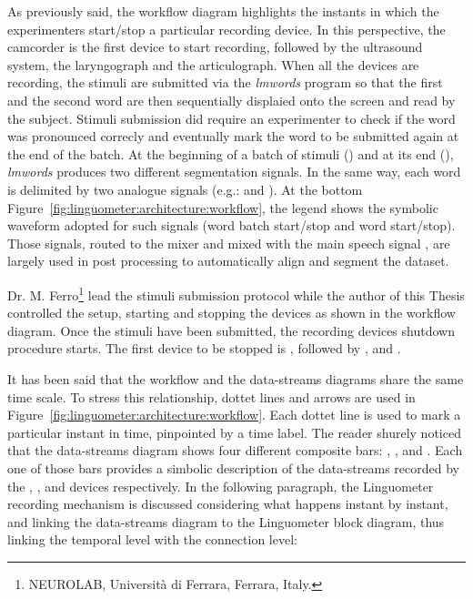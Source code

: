 As previously said, the workflow diagram highlights the instants in which the
experimenters start/stop a particular recording device.
In this perspective, the camcorder is the first device to start recording,
followed by the ultrasound system, the laryngograph and the articulograph.
When all the devices are recording, the stimuli are submitted via 
the \emph{lmwords} program so that the first and the second word are then 
sequentially displaied onto the screen and read by the subject.
Stimuli submission did require an experimenter to check if the word was
pronounced correcly and eventually mark the word to be submitted again at the
end of the batch.
At the beginning of a batch of stimuli () and at its end 
(), \emph{lmwords} produces two different segmentation signals.
In the same way, each word is delimited by two analogue signals 
(e.g.:  and ).
At the bottom Figure~\ref{fig:linguometer:architecture:workflow}, 
the legend shows the symbolic waveform adopted for such signals (word batch
start/stop and word start/stop).
Those signals, routed to the  mixer and mixed with the main speech
signal , are largely used in post processing to automatically align 
and segment the dataset.

Dr. M. Ferro\footnote{NEUROLAB, Universit\`a di Ferrara, Ferrara, Italy.} lead
the stimuli submission protocol while the author of this Thesis controlled the
setup, starting and stopping the devices as shown in the workflow diagram.
Once the stimuli have been submitted, the recording devices shutdown procedure
starts.
The first device to be stopped is , followed by ,  and
.


It has been said that the workflow and the data-streams diagrams share the 
same time scale. To stress this relationship, dottet lines and arrows 
are used in Figure~\ref{fig:linguometer:architecture:workflow}.
Each dottet line is used to mark a particular instant in time, pinpointed by a
time label.
The reader shurely noticed that the data-streams diagram shows four different 
composite bars: , ,  and .
Each one of those bars provides a simbolic description of the data-streams 
recorded by the , ,  and  devices respectively.
In the following paragraph, the Linguometer recording mechanism is discussed
considering what happens instant by instant, and linking the data-streams
diagram to the Linguometer block diagram, thus linking the temporal level with
the connection level:\\

